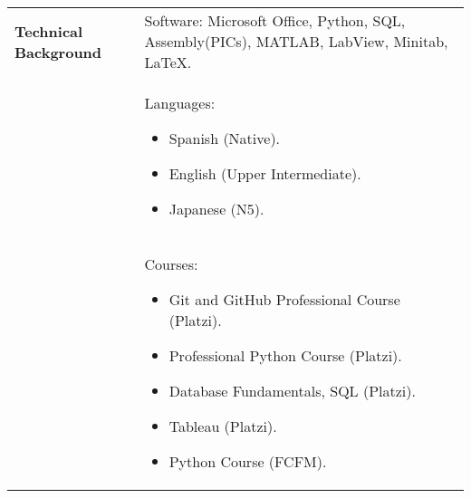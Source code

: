 \documentclass[twoside,letter,openright,10pt]{report}
\begin{document}
\begin{table}[hbt!]
\begin{tabular}{p{40mm}p{140mm}}
\\
\textbf{Technical Background}
& Software: Microsoft Office, Python, SQL, Assembly(PICs), MATLAB, LabView, Minitab, \LaTeX{}.
\\
& Languages:
\begin{itemize}[noitemsep,nolistsep]
\item Spanish (Native).
\item English (Upper Intermediate).
\item Japanese (N5).
\vspace{-4mm}
\end{itemize}
\\
& Courses:
\begin{itemize}[noitemsep,nolistsep]
\item Git and GitHub Professional Course (Platzi).
\item Professional Python Course (Platzi).
\item Database Fundamentals, SQL (Platzi).
\item Tableau (Platzi).
\item Python Course (FCFM).
\vspace{-4mm}
\end{itemize}
\end{tabular}
\end{table}
\end{document}
